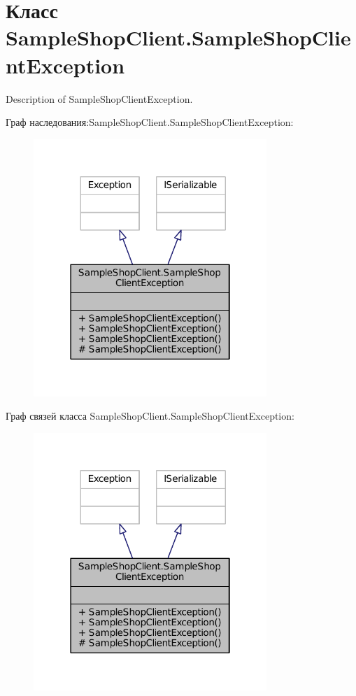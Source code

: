 \hypertarget{class_sample_shop_client_1_1_sample_shop_client_exception}{}\section{Класс Sample\+Shop\+Client.\+Sample\+Shop\+Client\+Exception}
\label{class_sample_shop_client_1_1_sample_shop_client_exception}


Description of Sample\+Shop\+Client\+Exception.  




Граф наследования\+:Sample\+Shop\+Client.\+Sample\+Shop\+Client\+Exception\+:
\nopagebreak
\begin{figure}[H]
\begin{center}
\leavevmode
\includegraphics[width=250pt]{class_sample_shop_client_1_1_sample_shop_client_exception__inherit__graph}
\end{center}
\end{figure}


Граф связей класса Sample\+Shop\+Client.\+Sample\+Shop\+Client\+Exception\+:
\nopagebreak
\begin{figure}[H]
\begin{center}
\leavevmode
\includegraphics[width=250pt]{class_sample_shop_client_1_1_sample_shop_client_exception__coll__graph}
\end{center}
\end{figure}
